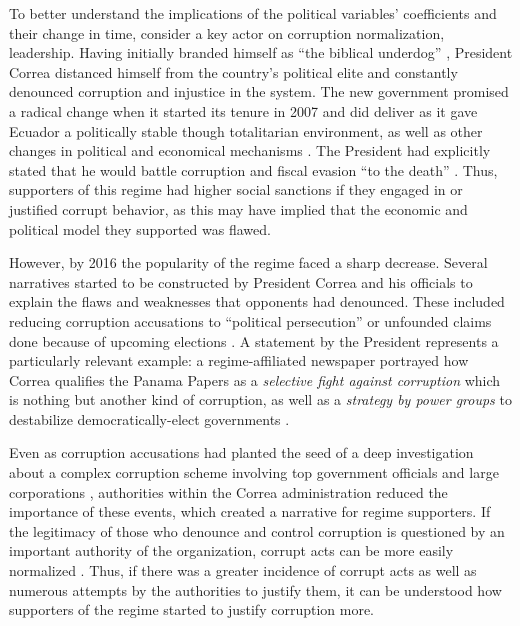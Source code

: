 \documentclass[12pt,a4]{article}\usepackage[]{graphicx}\usepackage[]{xcolor}
\begin{document}
To better understand the implications of the political variables' coefficients and their change in time, consider a key actor on corruption normalization, leadership. Having initially branded himself as \enquote{the biblical underdog} \parencite[para. 4]{Hedgecoe.2009}, President Correa distanced himself from the country's political elite and constantly denounced  corruption and injustice in the system. The new government promised a radical change when it started its tenure in 2007 and did deliver as it gave Ecuador a politically stable though totalitarian environment, as well as other changes in political and economical mechanisms \parencite{Weisbrot.2017}. The President had explicitly stated that he would battle corruption and fiscal evasion \enquote{to the death} \parencite{Ortiz.2013}. Thus, supporters of this regime had higher social sanctions if they engaged in or justified corrupt behavior, as this may have implied that the economic and political model they supported was flawed.

However, by 2016 the popularity of the regime faced a sharp decrease. Several narratives started to be constructed by President Correa and his officials to explain the flaws and weaknesses that opponents had denounced. These included reducing corruption accusations to \enquote{political persecution} or unfounded claims done because of upcoming elections \parencite{Melendez.2017}. A statement by the President represents a particularly relevant example: a regime-affiliated newspaper portrayed how Correa qualifies the Panama Papers as a \textit{selective fight against corruption} which is nothing but another kind of corruption, as well as a \textit{strategy by power groups} to destabilize democratically-elect governments \parencite[para. 5-7]{Telegrafo.2016}. 

Even as corruption accusations had planted the seed of a deep investigation about a complex corruption scheme involving top government officials and large corporations \parencite{Villavicencio.2019}, authorities within the Correa administration reduced the importance of these events, which created a narrative for regime supporters. If the legitimacy of those who denounce and control corruption is questioned by an important authority of the organization, corrupt acts can be more easily normalized \parencite{Ashforth.2003}. Thus, if there was a greater incidence of corrupt acts as well as numerous attempts by the authorities to justify them, it can be understood how supporters of the regime started to justify corruption more.
\end{document}
